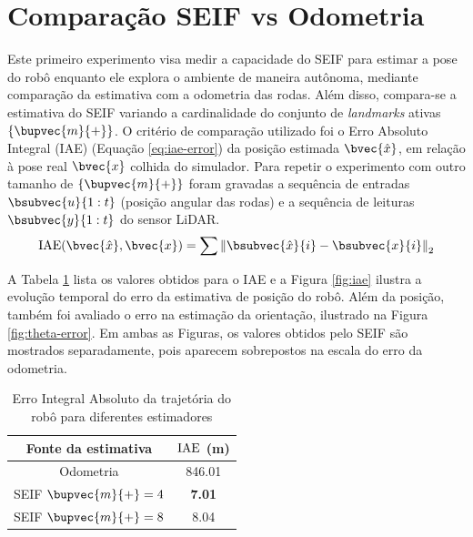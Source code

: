 
\section{Comparação SEIF vs Odometria}

Este primeiro experimento visa medir a capacidade do SEIF para estimar a 
pose do robô enquanto ele explora o ambiente de maneira autônoma, 
mediante comparação da estimativa 
com a odometria das rodas. Além disso, compara-se a estimativa do SEIF 
variando a cardinalidade do conjunto de \textit{landmarks} 
ativas $\{\bupvec{m}{+}\}$. O critério de comparação utilizado foi o 
Erro Absoluto Integral (IAE) (Equação \ref{eq:iae-error}) da posição estimada $\bvec{\hat{x}}$, em 
relação à pose real $\bvec{x}$ colhida do simulador. Para repetir o experimento com outro tamanho de $\{\bupvec{m}{+}\}$ foram gravadas a sequência de entradas $\bsubvec{u}{1:t}$ 
(posição angular das rodas) e a sequência de leituras $\bsubvec{y}{1:t}$ 
do sensor LiDAR.
\begin{equation}
  \IAE(\bvec{\hat{x}}, \bvec{x}) = \sum{
    \left\Vert \bsubvec{\hat{x}}{i} - \bsubvec{x}{i} \right\Vert_2
  }
  \label{eq:iae-error}
\end{equation}

A Tabela \ref{table:iae} lista os valores obtidos para o IAE e a Figura \ref{fig:iae} ilustra a evolução 
temporal do erro da estimativa de posição do robô. Além 
da posição, também foi avaliado o erro na estimação da 
orientação, ilustrado na Figura \ref{fig:theta-error}. Em ambas as 
Figuras, os valores obtidos pelo SEIF são mostrados separadamente, pois aparecem sobrepostos na escala do erro da odometria.

\begin{table}[]
\caption{Erro Integral Absoluto da trajetória do robô para diferentes estimadores}
\label{table:iae}
\center
\begin{tabular}{cc}
\hline
Fonte da estimativa & $\operatorname{IAE}$ (m) \\ \hline
Odometria & 846.01 \\
SEIF $\bupvec{m}{+} = 4$ & \textbf{7.01 }\\
SEIF $\bupvec{m}{+} = 8$ & 8.04 \\ \hline
\end{tabular}
\end{table}

